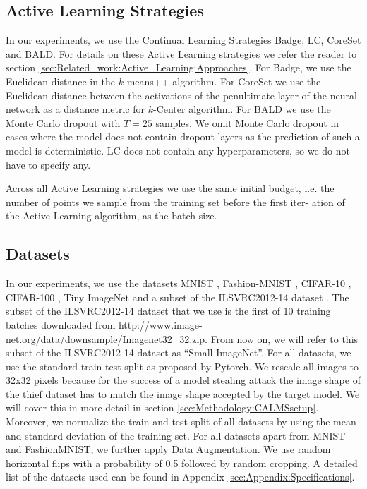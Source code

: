 \subsection{Active Learning Strategies}
\label{sec:ExperimentSetup:ALStrategies}
In our experiments, we use the Continual Learning Strategies Badge, LC, CoreSet and BALD. For details on these Active Learning strategies we refer
the reader to section \ref{sec:Related_work:Active_Learning:Approaches}. For Badge, we use the Euclidean distance in the $k$-means++ algorithm.
For CoreSet we use the Euclidean distance between the activations of the penultimate layer of the neural network as a distance metric for $k$-Center
algorithm. For BALD we use the Monte Carlo dropout with $T=25$ samples. We omit Monte Carlo dropout in cases where the model does not contain dropout
layers as the prediction of such a model is deterministic. LC does not contain any hyperparameters, so we do not have to specify any. \par
Across all Active Learning strategies we use the same initial budget, i.e. the number of points we sample from the training set before the first iter-
ation of the Active Learning algorithm, as the batch size.

\subsection{Datasets}
\label{sec:ExperimentSetup:Datasets}
In our experiments, we use the datasets MNIST \cite{mnist_web}, Fashion-MNIST \cite{xiao2017fashion}, CIFAR-10 \cite{cifar},
CIFAR-100 \cite{cifar}, Tiny ImageNet \cite{le2015tiny} and a subset of the ILSVRC2012-14 dataset \cite{imagenet}. The subset of the ILSVRC2012-14 dataset that we
use is the first of 10 training batches downloaded from \url{http://www.image-net.org/data/downsample/Imagenet32_32.zip}. From now on, we will refer to this subset
of the ILSVRC2012-14 dataset as \enquote{Small ImageNet}. For all datasets, we use the standard train test split as proposed by Pytorch. We rescale all images to 32x32
pixels because for the success of a model stealing attack the image shape of the thief dataset has to match the image shape accepted by the target model. We will cover
this in more detail in section \ref{sec:Methodology:CALMSsetup}. Moreover, we normalize the train and test split of all datasets by using the mean and standard deviation
of the training set. For all datasets apart from MNIST and FashionMNIST, we further apply Data Augmentation. We use random horizontal flips with a probability of 0.5
followed by random cropping. A detailed list of the datasets used can be found in Appendix \ref{sec:Appendix:Specifications}. \par


